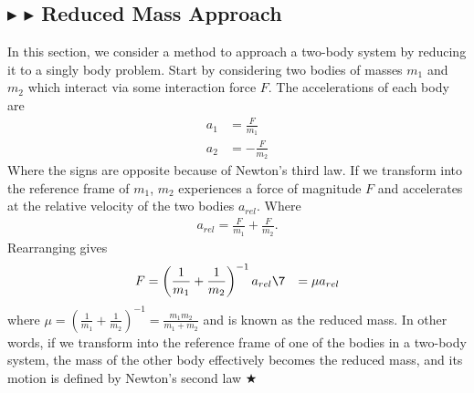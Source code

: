 \subsection{\color{Goldenrod} $\blacktriangleright$ \color{Orchid} $\blacktriangleright$ \color{black} Reduced Mass Approach}
In this section, we consider a method to approach a two-body system by reducing it to a singly body problem. Start by considering two bodies of masses $m_1$ and $m_2$ which interact via some interaction force $F$. The accelerations of each body are
\begin{align*}
    a_1 &= \frac{F}{m_1} \\
    a_2 &= -\frac{F}{m_2} 
\end{align*}
\noindent Where the signs are opposite because of Newton's third law. If we transform into the reference frame of $m_1$, $m_2$ experiences a force of magnitude $F$ and accelerates at the relative velocity of the two bodies $a_{rel}$. Where
\begin{gather*}
    a_{rel} = \frac{F}{m_1} + \frac{F}{m_2}.
\end{gather*}
\noindent Rearranging gives 
\begin{align}
    F &= \left( \frac{1}{m_1} + \frac{1}{m_2} \right)^{-1} a_{rel} \7
    &= \mu a_{rel}
\end{align}
\noindent where $\mu = \left( \frac{1}{m_1} + \frac{1}{m_2} \right)^{-1} = \frac{m_1m_2}{m_1 + m_2}$ and is known as the reduced mass. In other words, if we transform into the reference frame of one of the bodies in a two-body system, the mass of the other body effectively becomes the reduced mass, and its motion is defined by Newton's second law $\bigstar$

%
%
